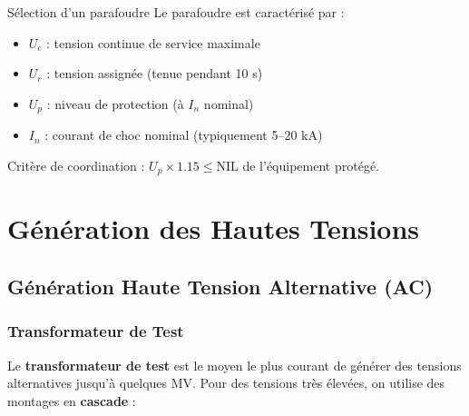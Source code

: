 \documentclass[12pt, a4paper, twoside]{report}
\begin{document}
\begin{retenir}{Sélection d'un parafoudre}
Le parafoudre est caractérisé par :
\begin{itemize}
  \item $U_c$ : tension continue de service maximale
  \item $U_r$ : tension assignée (tenue pendant 10 s)
  \item $U_p$ : niveau de protection (à $I_n$ nominal)
  \item $I_n$ : courant de choc nominal (typiquement 5--20 kA)
\end{itemize}
Critère de coordination : $U_p \times 1.15 \leq \text{NIL}$ de l'équipement protégé.
\end{retenir}

\chapter{Génération des Hautes Tensions}

\section{Génération Haute Tension Alternative (AC)}

\subsection{Transformateur de Test}

Le \textbf{transformateur de test} est le moyen le plus courant de générer des tensions
alternatives jusqu'à quelques MV. Pour des tensions très élevées, on utilise des montages
en \textbf{cascade} :
\end{document}
